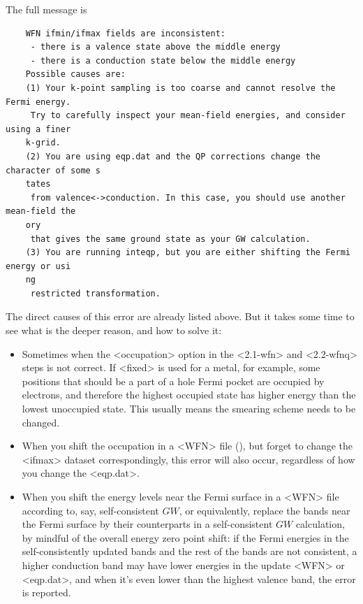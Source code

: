 \documentclass[hyperref, a4paper, 12pt]{report}
\def\texttt#1{<#1>}%
\newcommand{\shortcode}[1]{\texttt{#1}}
\begin{document}
The full message is 
\begin{lstlisting}
    WFN ifmin/ifmax fields are inconsistent:
     - there is a valence state above the middle energy
     - there is a conduction state below the middle energy
    Possible causes are:
    (1) Your k-point sampling is too coarse and cannot resolve the Fermi energy.
     Try to carefully inspect your mean-field energies, and consider using a finer 
    k-grid.
    (2) You are using eqp.dat and the QP corrections change the character of some s
    tates
     from valence<->conduction. In this case, you should use another mean-field the
    ory
     that gives the same ground state as your GW calculation.
    (3) You are running inteqp, but you are either shifting the Fermi energy or usi
    ng 
     restricted transformation.   
\end{lstlisting}

The direct causes of this error are already listed above.
But it takes some time to see what is the deeper reason, 
and how to solve it:
\begin{itemize}
    \item Sometimes when the \shortcode{occupation} option 
    in the \shortcode{2.1-wfn} and \shortcode{2.2-wfnq} steps 
    is not correct.
    If \shortcode{fixed} is used for a metal, for example, 
    some positions that should be a part of a hole Fermi pocket 
    are occupied by electrons,
    and therefore the highest occupied state has higher energy than the lowest unoccupied state.
    This usually means the smearing scheme needs to be changed.
    \item When you shift the occupation in a \shortcode{WFN} file (), 
    but forget to change the \shortcode{ifmax} dataset correspondingly, 
    this error will also occur,
    regardless of how you change the \shortcode{eqp.dat}.
    \item When you shift the energy levels near the Fermi surface  
        in a \shortcode{WFN} file
        according to, say, self-consistent $GW$,
        or equivalently, replace the bands near the Fermi surface 
        by their counterparts in a self-consistent $GW$ calculation,
        by mindful of the overall energy zero point shift: 
        if the Fermi energies in the self-consistently updated bands 
        and the rest of the bands are not consistent, 
        a higher conduction band may have lower energies 
        in the update \shortcode{WFN} or \shortcode{eqp.dat}, 
        and when it's even lower than the highest valence band, 
        the error is reported.
\end{itemize}
\end{document}
